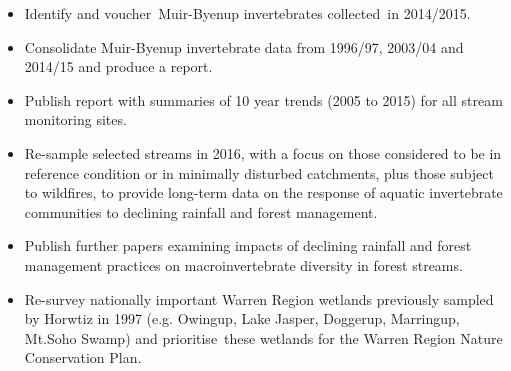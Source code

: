 \documentclass[version=last,
    paper=a4, %
    10pt, %
    usenames,
    dvipsnames,
    oneside, %
    headings=openany, %
    DIV=15 %
]{scrbook}
\begin{document}
\begin{itemize}
\itemsep1pt\parskip0pt
\item
  Identify and voucher~Muir-Byenup invertebrates collected~in 2014/2015.
\item
  Consolidate Muir-Byenup invertebrate data from 1996/97, 2003/04 and
  2014/15 and produce a report.
\item
  Publish report with summaries of 10 year trends (2005 to 2015) for all
  stream monitoring sites.
\item
  Re-sample selected streams in 2016, with a focus on those considered
  to be in reference condition or in minimally disturbed catchments,
  plus those subject to wildfires, to provide long-term data on the
  response of aquatic invertebrate communities to declining rainfall and
  forest management.
\item
  Publish further papers examining impacts of declining rainfall and
  forest management practices on macroinvertebrate diversity in forest
  streams.
\item
  Re-survey nationally important Warren Region wetlands previously
  sampled by Horwtiz in 1997 (e.g. Owingup, Lake Jasper, Doggerup,
  Marringup, Mt.Soho Swamp) and prioritise~these wetlands for the Warren
  Region Nature Conservation Plan.
\end{itemize}



\end{document}
